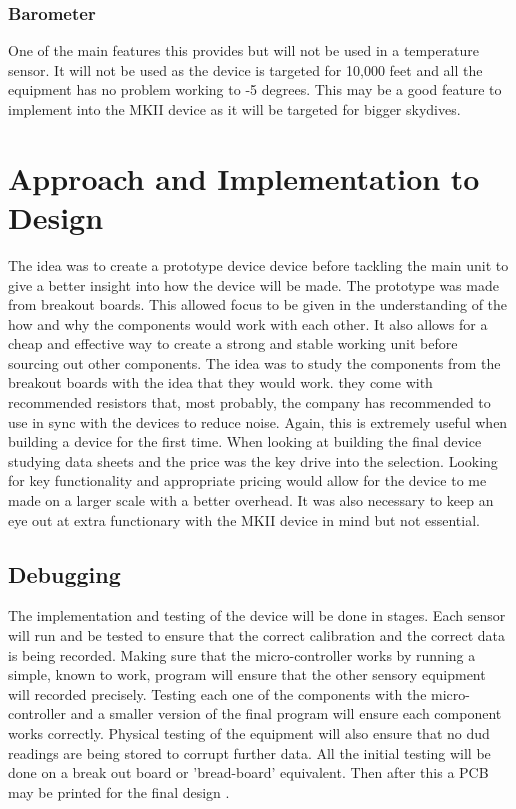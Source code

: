 \documentclass{report}
\begin{document}
\subsubsection{Barometer}
One of the main features this provides but will not be used in a temperature sensor. It will not be used as the device is targeted for 10,000 feet and all the equipment has no problem working to -5 degrees. This may be a good feature to implement into the MKII device as it will be targeted for bigger skydives.
  
\section{Approach and Implementation to Design}
The idea was to create a prototype device device before tackling the main unit to give a better insight into how the device will be made. The prototype was made from breakout boards. This allowed focus to be given in the understanding of the how and why the components would work with each other. It also allows for a cheap and effective way to create a strong and stable working unit before sourcing out other components. The idea was to study the components from the breakout boards with the idea that they would work. they come with recommended resistors that, most probably, the company has recommended to use in sync with the devices to reduce noise. Again, this is extremely useful when building a device for the first time.
When looking at building the final device studying data sheets and the price was the key drive into the selection. Looking for key functionality and appropriate pricing would allow for the device to me made on a larger scale with a better overhead. It was also necessary to keep an eye out at extra functionary with the MKII device in mind but not essential.
  
\subsection{Debugging}
The implementation and testing of the device will be done in stages. Each sensor will run and be tested to ensure that the correct calibration and the correct data is being recorded. Making sure that the micro-controller works by running a simple, known to work, program will ensure that the other sensory equipment will recorded precisely. 
Testing each one of the components with the micro-controller and a smaller version of the final program will ensure each component works correctly. Physical testing of the equipment will also ensure that no dud readings are being stored to corrupt further data. 
All the initial testing will be done on a break out board or 'bread-board' equivalent. Then after this a PCB may be printed for the final design .
\end{document}
